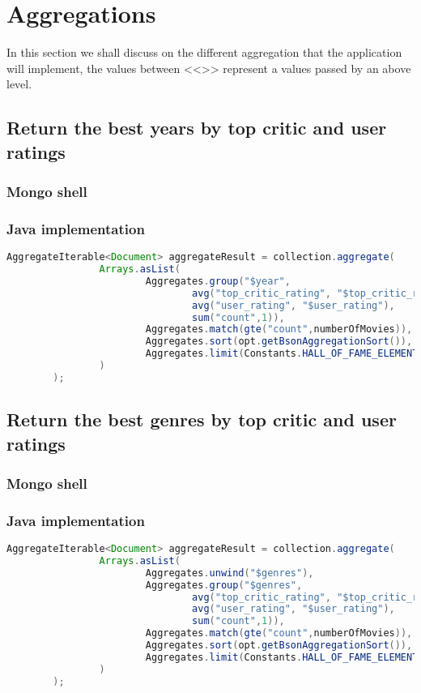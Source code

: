 \section{Aggregations}
In this section we shall discuss on the different aggregation that the application will implement, the values between <<>> represent a values passed by an above level.

\subsection{Return the best years by top critic and user ratings}\label{subsec:bestYear}
\subsubsection{Mongo shell}

\subsubsection{Java implementation}
\begin{lstlisting}[language=Java]
AggregateIterable<Document> aggregateResult = collection.aggregate(
                Arrays.asList(
                        Aggregates.group("$year",
                                avg("top_critic_rating", "$top_critic_rating"),
                                avg("user_rating", "$user_rating"),
                                sum("count",1)),
                        Aggregates.match(gte("count",numberOfMovies)),
                        Aggregates.sort(opt.getBsonAggregationSort()),
                        Aggregates.limit(Constants.HALL_OF_FAME_ELEMENT_NUMBERS)
                )
        );
\end{lstlisting}

\subsection{Return the best genres by top critic and user ratings}\label{subsec:HOFGenres}
\subsubsection{Mongo shell}

\subsubsection{Java implementation}
\begin{lstlisting}[language=Java]
AggregateIterable<Document> aggregateResult = collection.aggregate(
                Arrays.asList(
                        Aggregates.unwind("$genres"),
                        Aggregates.group("$genres",
                                avg("top_critic_rating", "$top_critic_rating"),
                                avg("user_rating", "$user_rating"),
                                sum("count",1)),
                        Aggregates.match(gte("count",numberOfMovies)),
                        Aggregates.sort(opt.getBsonAggregationSort()),
                        Aggregates.limit(Constants.HALL_OF_FAME_ELEMENT_NUMBERS)
                )
        );
\end{lstlisting}

